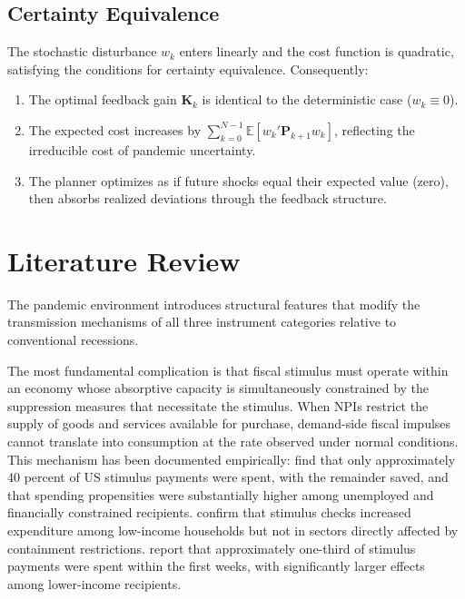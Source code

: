 \subsection{Certainty Equivalence}
The stochastic disturbance $w_k$ enters linearly and the cost function 
is quadratic, satisfying the conditions for certainty equivalence. 
Consequently:
\begin{enumerate}
    \item The optimal feedback gain $\bm{K}_k$ is identical to the 
    deterministic case ($w_k \equiv 0$).
    \item The expected cost increases by 
    $\sum_{k=0}^{N-1} \mathbb{E}[w_k' \bm{P}_{k+1} w_k]$, reflecting 
    the irreducible cost of pandemic uncertainty.
    \item The planner optimizes as if future shocks equal their 
    expected value (zero), then absorbs realized deviations through 
    the feedback structure.
\end{enumerate}

\section{Literature Review}

The pandemic environment introduces structural features that modify the transmission mechanisms of all three instrument categories relative to conventional recessions.

The most fundamental complication is that fiscal stimulus must operate within an economy whose absorptive capacity is simultaneously constrained by the suppression measures that necessitate the stimulus. When NPIs restrict the supply of goods and services available for purchase, demand-side fiscal impulses cannot translate into consumption at the rate observed under normal conditions. This mechanism has been documented empirically: \cite{coibion2020} find that only approximately 40 percent of US stimulus payments were spent, with the remainder saved, and that spending propensities were substantially higher among unemployed and financially constrained recipients. \cite{chetty2020} confirm that stimulus checks increased expenditure among low-income households but not in sectors directly affected by containment restrictions. \cite{baker2020} report that approximately one-third of stimulus payments were spent within the first weeks, with significantly larger effects among lower-income recipients.

